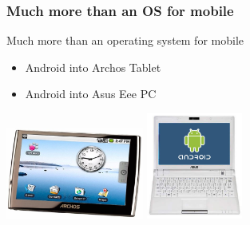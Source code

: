 \documentclass{beamer}
\begin{document}

\begin{frame}
\frametitle{Much more than an OS for mobile}

\begin{center}
\begin{large}
Much more than an operating system for mobile
\end{large}
\end{center}
\hspace{0.2cm}

\begin{itemize}

\item Android into Archos Tablet
\item Android into Asus Eee PC 
\end{itemize}

\begin{center}
\includegraphics[height=3.0cm]{figs/archos-android}
\vspace{2.0cm}
\includegraphics[height=3.5cm]{figs/eee_pc_android}
\end{center}

\end{frame}
\end{document}
